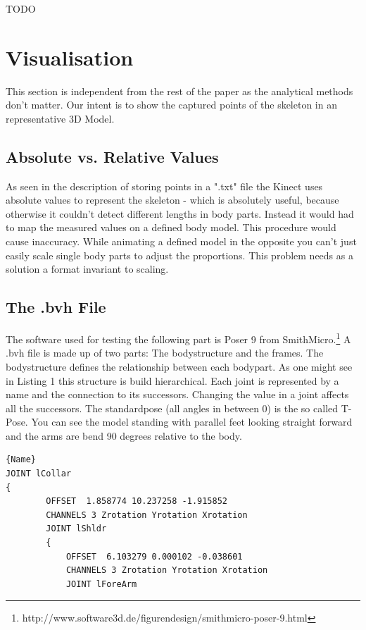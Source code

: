 \documentclass[a4paper]{article}
\begin{document}
TODO

\section{Visualisation}

This section is independent from the rest of the paper as the analytical methods don't matter.
Our intent is to show the captured points of the skeleton in an representative 3D Model.

\subsection{Absolute vs. Relative Values}

As seen in the description of storing points in a ".txt" file the Kinect uses absolute values to represent the skeleton  - which is absolutely useful, because otherwise it couldn't detect different lengths in body parts.
Instead it would had to map the measured values on a defined body model.
This procedure would cause inaccuracy.
While animating a defined model in the opposite you can't just easily scale single body parts to adjust the proportions.
This problem needs as a solution a format invariant to scaling.

\subsection{The .bvh File}

The software used for testing the following part is Poser 9 from SmithMicro.\footnote{http://www.software3d.de/figurendesign/smithmicro-poser-9.html}
A .bvh file is made up of two parts: The bodystructure and the frames.
The bodystructure defines the relationship between each bodypart.
As one might see in Listing 1 this structure is build hierarchical.
Each joint is represented by a name and the connection to its successors.
Changing the value in a joint affects all the successors. 
The standardpose (all angles in between 0) is the so called T-Pose.
You can see the model standing with parallel feet looking straight forward and the arms are bend 90 degrees relative to the body.

\begin{lstlisting}[caption=.bvh Connected Structure]{Name}
JOINT lCollar
{
		OFFSET	1.858774 10.237258 -1.915852
		CHANNELS 3 Zrotation Yrotation Xrotation
		JOINT lShldr
		{
			OFFSET	6.103279 0.000102 -0.038601
			CHANNELS 3 Zrotation Yrotation Xrotation
			JOINT lForeArm
\end{lstlisting}
\end{document}
